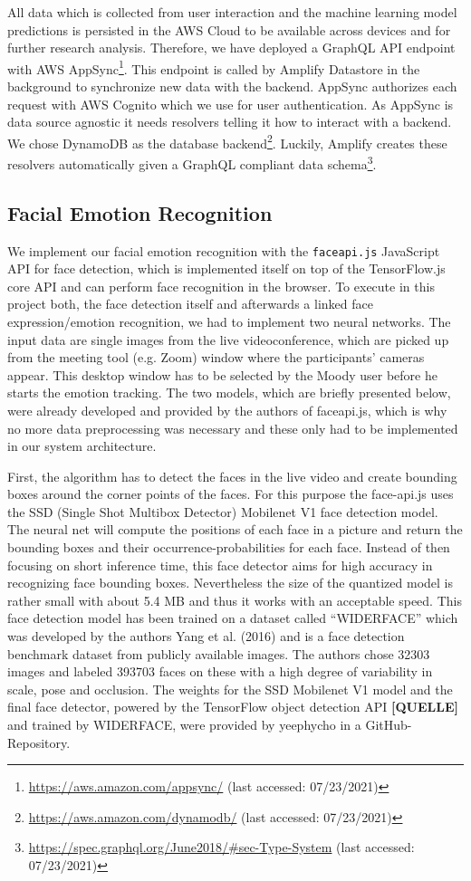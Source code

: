 All data which is collected from user interaction and the machine learning model predictions is persisted in the AWS Cloud to be available across devices and for further research analysis. Therefore, we have deployed a GraphQL API endpoint with AWS AppSync\footnote{\url{https://aws.amazon.com/appsync/} (last accessed: 07/23/2021)}. This endpoint is called by Amplify Datastore in the background to synchronize new data with the backend. AppSync authorizes each request with AWS Cognito which we use for user authentication. As AppSync is data source agnostic it needs resolvers telling it how to interact with a backend. We chose DynamoDB as the database backend\footnote{\url{https://aws.amazon.com/dynamodb/} (last accessed: 07/23/2021)}. Luckily, Amplify creates these resolvers automatically given a GraphQL compliant data schema\footnote{\url{https://spec.graphql.org/June2018/#sec-Type-System} (last accessed: 07/23/2021)}.

\subsection{Facial Emotion Recognition}
\label{subsec:method_facial_emotion_recognition}
We implement our facial emotion recognition with the \texttt{faceapi.js} JavaScript API for face detection, which is implemented itself on top of the TensorFlow.js core API and can perform face recognition in the browser. To execute in this project both, the face detection itself and afterwards a linked face expression/emotion recognition, we had to implement two neural networks. The input data are single images from the live videoconference, which are picked up from the meeting tool (e.g. Zoom) window where the participants’ cameras appear. This desktop window has to be selected by the Moody user before he starts the emotion tracking. The two models, which are briefly presented below, were already developed and provided by the authors of faceapi.js, which is why no more data preprocessing was necessary and these only had to be implemented in our system architecture.

First, the algorithm has to detect the faces in the live video and create bounding boxes around the corner points of the faces. For this purpose the face-api.js uses the SSD (Single Shot Multibox Detector) Mobilenet V1 face detection model. The neural net will compute the positions of each face in a picture and return the bounding boxes and their occurrence-probabilities for each face. Instead of then focusing on short inference time, this face detector aims for high accuracy in recognizing face bounding boxes. Nevertheless the size of the quantized model is rather small with about 5.4 MB and thus it works with an acceptable speed. This face detection model has been trained on a dataset called “WIDERFACE” which was developed by the authors Yang et al. (2016) and is a face detection benchmark dataset from publicly available images. The authors chose 32303 images and labeled 393703 faces on these with a high degree of variability in scale, pose and occlusion. The weights for the SSD Mobilenet V1 model and the final face detector, powered by the TensorFlow object detection API \textbf{[QUELLE]} and trained by WIDERFACE, were provided by yeephycho in a GitHub-Repository.

